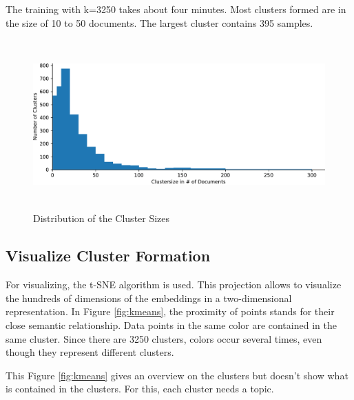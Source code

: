 The training with k=3250 takes about four minutes. Most clusters formed are in the size of 10 to 50 documents. The largest cluster contains 395 samples.

\begin{figure}[!h]
	\centering
	\includegraphics[height=6.5cm]{Bilder/models/clustersize.pdf}
	\caption{Distribution of the Cluster Sizes}
	\label{fig:clustersize}
\end{figure}

\subsection{Visualize Cluster Formation}
For visualizing, the \ac{t-SNE} algorithm is used. This projection allows to visualize the hundreds of dimensions of the embeddings in a two-dimensional representation. In Figure \ref{fig:kmeans}, the proximity of points stands for their close semantic relationship. Data points in the same color are contained in the same cluster. Since there are 3250 clusters, colors occur several times, even though they represent different clusters.

This Figure \ref{fig:kmeans} gives an overview on the clusters but doesn't show what is contained in the clusters. For this, each cluster needs a topic.

